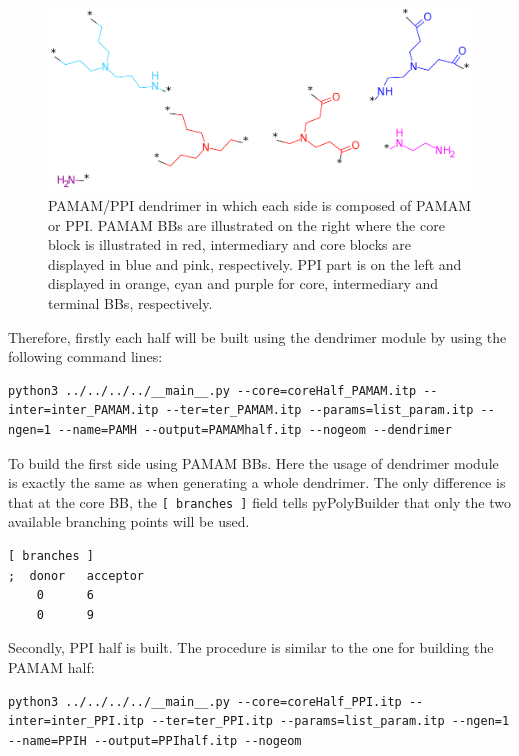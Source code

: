 \begin{figure}
    \centering
    \includegraphics[width=\textwidth]{PAMAM_PPI-half/PAMAMPPIBBs.png}
    \caption{PAMAM/PPI dendrimer in which each side is composed of PAMAM or PPI. PAMAM BBs are illustrated on the right where the core block is illustrated in red, intermediary and core blocks are displayed in blue and pink, respectively. PPI part is on the left and displayed in orange, cyan and purple for core, intermediary and terminal BBs, respectively.}
    \label{fig:HalfBBs}
\end{figure}

Therefore, firstly each half will be built using the dendrimer module by using the following command lines:

\begin{lstlisting}
python3 ../../../../__main__.py --core=coreHalf_PAMAM.itp --inter=inter_PAMAM.itp --ter=ter_PAMAM.itp --params=list_param.itp --ngen=1 --name=PAMH --output=PAMAMhalf.itp --nogeom --dendrimer
\end{lstlisting}

To build the first side using PAMAM BBs.
Here the usage of dendrimer module is exactly the same as when generating a whole dendrimer.
The only difference is that at the core BB, the \texttt{[ branches ]} field tells pyPolyBuilder that only the two available branching points will be used.

\begin{lstlisting}
[ branches ]
;  donor   acceptor
    0      6
    0      9
\end{lstlisting}

Secondly, PPI half is built.
The procedure is similar to the one for building the PAMAM half:

\begin{lstlisting}
python3 ../../../../__main__.py --core=coreHalf_PPI.itp --inter=inter_PPI.itp --ter=ter_PPI.itp --params=list_param.itp --ngen=1 --name=PPIH --output=PPIhalf.itp --nogeom
\end{lstlisting}

